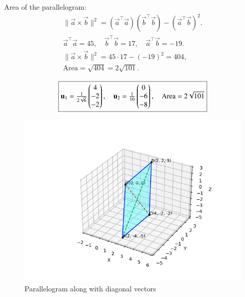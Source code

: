 \documentclass[12pt]{article}
\begin{document}
Area of the parallelogram:
\begin{align}
\|\vec{a}\times\vec{b}\|^2 
= (\vec{a}^\top\vec{a})(\vec{b}^\top\vec{b}) - (\vec{a}^\top\vec{b})^2.
\\
\vec{a}^\top\vec{a} = 45, 
\quad 
\vec{b}^\top\vec{b} = 17, 
\quad 
\vec{a}^\top\vec{b} = -19.
\\
\|\vec{a}\times\vec{b}\|^2 = 45 \cdot 17 - (-19)^2 = 404,
\\
\text{Area} = \sqrt{404} = 2\sqrt{101}.
\end{align}

\begin{align*}
\boxed{\mathbf{u}_1 = \tfrac{1}{2\sqrt{6}}\begin{pmatrix}4 \\ -2 \\ -2\end{pmatrix}, 
\quad 
\mathbf{u}_2 = \tfrac{1}{10}\begin{pmatrix}0 \\ -6 \\ -8\end{pmatrix}, 
\quad 
\text{Area} = 2\sqrt{101}}
\end{align*}

\begin{figure}[H]\centering
\includegraphics[width=1\columnwidth]{figs/plt.png}
\caption{Parallelogram along with diagonal vectors}
\label{fig:plt}
\end{figure}
\end{document}
